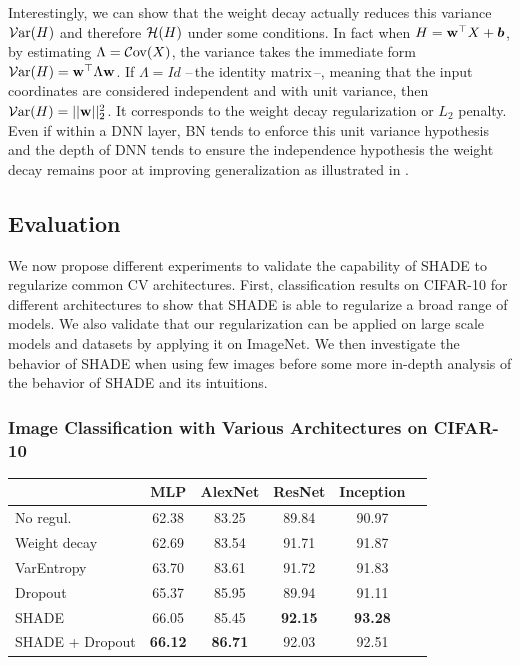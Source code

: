     Interestingly, we can show that the weight decay actually reduces this variance $\mathcal{V}\mathrm{ar}(H)$ and therefore $\mathcal{H}(H)$ under some conditions. In fact when $H = \mathbf{w}^\top X + \boldsymbol{b}$, by estimating $\Lambda = \mathcal{C}\mathrm{ov}(X)$, the variance takes the immediate form $\mathcal{V}\mathrm{ar}(H) = \mathbf{w}^{\top} \Lambda \mathbf{w}$. If $\Lambda = I\!d$ --\,the identity matrix\,--, meaning that the input coordinates are considered independent and with unit variance, then $\mathcal{V}\mathrm{ar}(H)= ||\mathbf{w}||_2^2$. It corresponds to the weight decay regularization or $L_2$ penalty. Even if within a \ac{DNN} layer, \acf{BN} tends to enforce this unit variance hypothesis and the depth of \ac{DNN} tends to ensure the independence hypothesis the weight decay remains poor at improving generalization as illustrated in \citet{rethinking}.



\subsection{Evaluation}
\label{shade:sec:expes}

We now propose different experiments to validate the capability of \ac{SHADE} to regularize common \acf{CV} architectures. First, classification results on CIFAR-10 for different architectures to show that \ac{SHADE} is able to regularize a broad range of models. We also validate that our regularization can be applied on large scale models and datasets by applying it on ImageNet. We then investigate the behavior of \ac{SHADE} when using few images before some more in-depth analysis of the behavior of \ac{SHADE} and its intuitions.

    \subsubsection{Image Classification with Various Architectures on CIFAR-10}
    \label{shade:sec:cifar10}
    
    \begin{table}[t]
            \centering
            \begin{tabular}{lccccc}
            \toprule
                            & MLP & AlexNet & ResNet & Inception\\
            \midrule
            No regul.        & 62.38 & 83.25 & 89.84 & 90.97 \\
            Weight decay     & 62.69 & 83.54 & 91.71 & 91.87 \\
            VarEntropy       & 63.70 & 83.61 & 91.72 & 91.83 \\
            Dropout          & 65.37 & 85.95 & 89.94 & 91.11 \\
            \cmidrule{1-5}
            SHADE            & 66.05 & 85.45 & \textbf{92.15} & \textbf{93.28}\\
            SHADE + Dropout  & \textbf{66.12} & \textbf{86.71} &  92.03 &  92.51\\
            \bottomrule
            \end{tabular}
            \label{shade:accuracies}
        \end{table}
         
